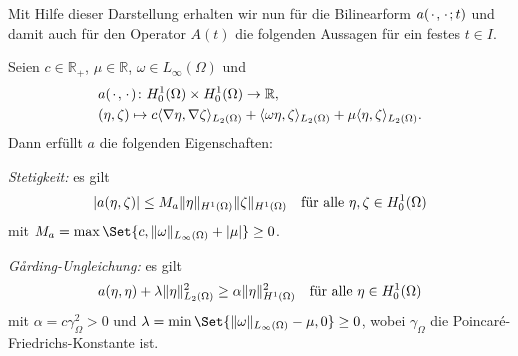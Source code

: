 Mit Hilfe dieser Darstellung erhalten wir nun für die Bilinearform $a({\mkern2mu\cdot\mkern2mu}, {\mkern2mu\cdot\mkern2mu}; t)$ und damit auch für den Operator $A(t)$ die folgenden Aussagen für ein festes $t \in I$.
%
\begin{Satz}
\label{satz:ps:rzvp:bilinearform_a_eigenschaften}
    Seien $c \in \mathbb{R}_{+}$, $\mu \in \mathbb{R}$, $\omega \in L_{\infty}(\Omega)$ und
    \begin{equation}
    \label{eq:ps:rzvp:bilinearform_a}
        \begin{aligned}
            &a({\mkern2mu\cdot\mkern2mu}, {\mkern2mu\cdot\mkern2mu}) \colon H^{1}_{0}(\Omega) \times H^{1}_{0}(\Omega) \to \mathbb{R}, \\
            &(\eta, \zeta) \mapsto c\langle\nabla \eta,\nabla \zeta\rangle_{L_{2}(\Omega)} + \langle\omega \eta,\zeta\rangle_{L_{2}(\Omega)} + \mu \langle\eta,\zeta\rangle_{L_{2}(\Omega)}.
        \end{aligned}
    \end{equation}
    Dann erfüllt $a$ die folgenden Eigenschaften:
    \begin{thmenumerate}
        \item\label{satz:ps:rzvp:bilinearform_a_eigenschaften_stetig}
        \emph{Stetigkeit:} es gilt
        \begin{equation}
            \lvert a(\eta, \zeta)\rvert \leq M_{a} \lVert\eta\rVert_{H^{1}(\Omega)} \lVert\zeta\rVert_{H^{1}(\Omega)} \quad \text{für alle}~\eta, \zeta \in H^{1}_{0}(\Omega)
        \end{equation}
        mit $M_{a} = \max\Set{c, \norm{\omega}_{L_{\infty}(\Omega)} + \abs{\mu}} \geq 0$.
        \item\label{satz:ps:rzvp:bilinearform_a_eigenschaften_garding}
        \emph{G\aa{}rding-Ungleichung:} es gilt
        \begin{equation}
                a(\eta, \eta) + \lambda \lVert\eta\rVert_{L_{2}(\Omega)}^{2} \geq \alpha \lVert\eta\rVert_{H^{1}(\Omega)}^{2} \quad \text{für alle}~\eta \in H^{1}_{0}(\Omega)
        \end{equation}
        mit $\alpha = c \gamma_{\Omega}^{2} > 0$ und $\lambda = \min\Set{\norm{\omega}_{L_{\infty}(\Omega)} - \mu, 0} \geq 0$, wobei $\gamma_{\Omega}$ die Poincaré-Friedrichs-Konstante ist.
    \end{thmenumerate}


\end{Satz}
